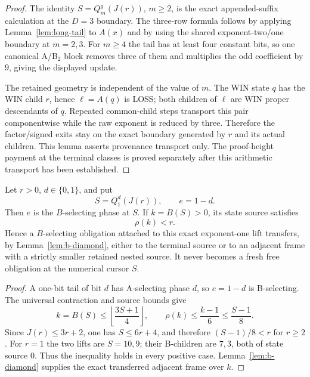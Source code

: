 \begin{proof}
The identity $S=Q_m^g(J(r))$, $m\ge2$, is the exact appended-suffix
calculation at the $D=3$ boundary. The three-row formula follows by applying
Lemma~\ref{lem:long-tail} to $A(x)$ and by using the shared exponent-two/one
boundary at $m=2,3$. For $m\ge4$ the tail has at least four constant bits,
so one canonical A/B$_2$ block removes three of them and multiplies the odd
coefficient by $9$, giving the displayed update.

The retained geometry is independent of the value of $m$. The WIN state $q$
has the WIN child $r$, hence $\ell=A(q)$ is LOSS; both children of $\ell$
are WIN proper descendants of $q$. Repeated common-child steps transport this
pair componentwise while the raw exponent is reduced by three. Therefore the
factor/signed exits stay on the exact boundary generated by $r$ and its actual
children. This lemma asserts provenance transport only.  The proof-height
payment at the terminal classes is proved separately after this arithmetic
transport has been established.
\end{proof}

\begin{lemma}
\label{lem:attached-b}
Let $r>0$, $d\in\{0,1\}$, and put
\[
 S=Q_1^d(J(r)),\qquad e=1-d.
\]
Then $e$ is the $B$-selecting phase at $S$.  If $k=B(S)>0$, its state source
satisfies
\[
 \boxed{\rho(k)<r}.
\]
Hence a $B$-selecting obligation attached to this exact exponent-one lift
transfers, by Lemma~\ref{lem:b-diamond}, either to the terminal source or to
an adjacent frame with a strictly smaller retained nested source.  It never
becomes a fresh free obligation at the numerical cursor $S$.
\end{lemma}

\begin{proof}
A one-bit tail of bit $d$ has A-selecting phase $d$, so $e=1-d$ is
B-selecting.  The universal contraction and source bounds give
\[
 k=B(S)\le\left\lfloor\frac{3S+1}{4}\right\rfloor,
 \qquad
 \rho(k)\le\frac{k-1}{6}\le\frac{S-1}{8}.
\]
Since $J(r)\le3r+2$, one has $S\le6r+4$, and therefore
$(S-1)/8<r$ for $r\ge2$.  For $r=1$ the two lifts are $S=10,9$;
their B-children are $7,3$, both of state source $0$.  Thus the inequality
holds in every positive case.  Lemma~\ref{lem:b-diamond} supplies the exact
transferred adjacent frame over $k$.
\end{proof}

